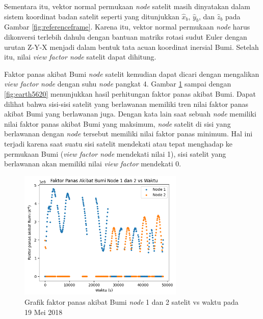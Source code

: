 Sementara itu, vektor normal permukaan \textit{node} satelit masih dinyatakan
dalam sistem koordinat badan satelit seperti yang ditunjukkan $\hat{x}_b$,
$\hat{y}_b$, dan $\hat{z}_b$ pada Gambar \ref{fig:referenceframe}. Karena itu, vektor normal permukaan \textit{node}
harus dikonversi terlebih dahulu dengan bantuan matriks rotasi sudut Euler
dengan urutan Z-Y-X menjadi dalam bentuk tata acuan koordinat inersial Bumi.
Setelah itu, nilai \textit{view factor node} satelit dapat dihitung. 

Faktor panas akibat Bumi \textit{node} satelit kemudian dapat dicari dengan
mengalikan \textit{view factor node} dengan suhu \textit{node} pangkat 4.
Gambar \ref{fig:earth1219} sampai dengan \ref{fig:earth5620} menunjukkan hasil
perhitungan faktor panas akibat Bumi. Dapat dilihat bahwa sisi-sisi satelit
yang berlawanan memiliki tren nilai faktor panas akibat Bumi yang berlawanan
juga. Dengan kata lain saat sebuah \textit{node} memiliki nilai faktor panas
akibat Bumi yang maksimum, \textit{node} satelit di sisi yang berlawanan dengan
\textit{node} tersebut memiliki nilai faktor panas minimum. Hal ini terjadi
karena saat suatu sisi satelit mendekati atau tepat menghadap ke  permukaan Bumi
(\textit{view factor node} mendekati nilai 1), sisi satelit yang berlawanan akan memiliki nilai \textit{view factor} mendekati 0.

\begin{figure}[H]
\setlength{}
\begin{center}
\includegraphics[width=0.7\textwidth]{fig/earth_node12_2018-05-19.png}
	\caption{Grafik faktor panas akibat Bumi \textit{node} 1 dan 2 satelit vs waktu pada 19 Mei 2018}
\label{fig:earth1219}
\end{center}
\end{figure}

